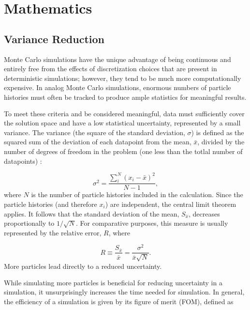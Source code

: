 \documentclass[10pt]{article}
\begin{document}
\section{Mathematics}
\label{sec:math}

\subsection{Variance Reduction} %
\label{sec:math:var-red}

Monte Carlo simulations have the unique advantage of being continuous and entirely free from the effects of discretization choices that are present in deterministic simulations; however, they tend to be much more computationally expensive.
In analog Monte Carlo simulations, enormous numbers of particle histories must often be tracked to produce ample statistics for meaningful results.

To meet these criteria and be considered meaningful, data must sufficiently cover the solution space and have a low statistical uncertainty, represented by a small variance.
The variance (the square of the standard deviation, $\sigma$) is defined as the squared sum of the deviation of each datapoint from the mean, $\bar{x}$, divided by the number of degrees of freedom in the problem (one less than the totlal number of datapoints) \cite{hughes}:

\begin{equation*}
\sigma^{2} = \frac{\sum_{i}^{N}{\left(x_{i}-\bar{x}\right)^{2}}}{N-1} ,
\end{equation*}
%
where $N$ is the number of particle histories included in the calculation.
Since the particle histories (and therefore $x_{i}$) are independent, the central limit theorem applies.
It follows that the standard deviation of the mean, $S_{\bar{x}}$, decreases proportionally to $1/\sqrt{N}$.
For comparative purposes, this measure is usually represented by the relative error, $R$, where

\begin{equation*}
R \equiv \frac{S_{\bar{x}}}{\bar{x}} = \frac{\sigma^{2}}{\bar{x}\sqrt{N}}.
\end{equation*}
%
More particles lead directly to a reduced uncertainty.

While simulating more particles is beneficial for reducing uncertainty in a simulation, it unsurprisingly increases the time needed for simulation.
In general, the efficiency of a simulation is given by its figure of merit (FOM), defined as
\end{document}

